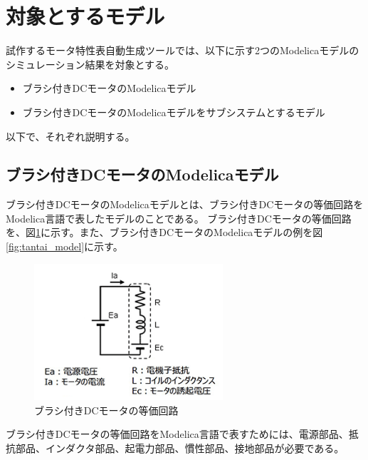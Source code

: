 \section{対象とするモデル}\label{taioumodel}
試作するモータ特性表自動生成ツールでは、以下に示す2つのModelicaモデルのシミュレーション結果を対象とする。
\begin{itemize}
	\item ブラシ付きDCモータのModelicaモデル
	\item ブラシ付きDCモータのModelicaモデルをサブシステムとするモデル
\end{itemize}

以下で、それぞれ説明する。
\subsection{ブラシ付きDCモータのModelicaモデル}\label{sub:tanntai}
ブラシ付きDCモータのModelicaモデルとは、ブラシ付きDCモータの等価回路\cite{等価回路}をModelica言語で表したモデルのことである。
ブラシ付きDCモータの等価回路を、図\ref{fig:touka}に示す。また、ブラシ付きDCモータのModelicaモデルの例を図\ref{fig:tantai_model}に示す。
\begin{figure}[t]
	\centering
	\includegraphics[width=7cm]{./Image/touka.png}
	\caption{ブラシ付きDCモータの等価回路}
	\label{fig:touka}
  \end{figure}
ブラシ付きDCモータの等価回路をModelica言語で表すためには、電源部品、抵抗部品、インダクタ部品、起電力部品、慣性部品、接地部品が必要である。

